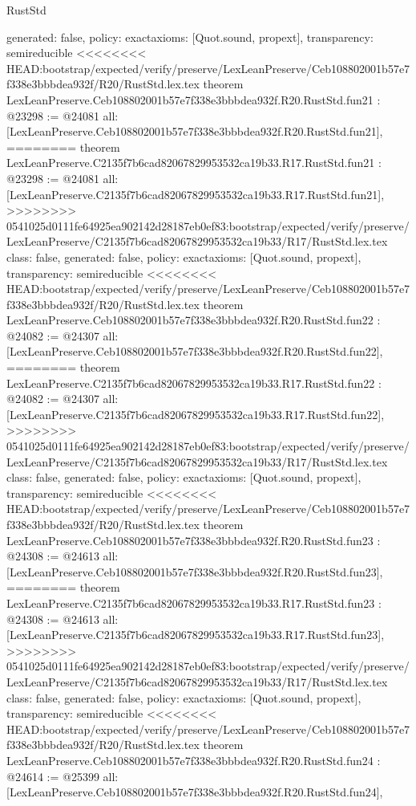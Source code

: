 \begin{lexlean}{RustStd}
\begin{coremodule}
{\begin{coremodule}
{{{{{{{{{{{{{{{{{{{{{{{{  generated: false,
  policy: exact{axioms: [Quot.sound, propext]},
  transparency: semireducible
}
<<<<<<<< HEAD:bootstrap/expected/verify/preserve/LexLeanPreserve/Ceb108802001b57e7f338e3bbbdea932f/R20/RustStd.lex.tex
theorem LexLeanPreserve.Ceb108802001b57e7f338e3bbbdea932f.R20.RustStd.fun21 : @23298 := @24081 {
  all: [LexLeanPreserve.Ceb108802001b57e7f338e3bbbdea932f.R20.RustStd.fun21],
========
theorem LexLeanPreserve.C2135f7b6cad82067829953532ca19b33.R17.RustStd.fun21 : @23298 := @24081 {
  all: [LexLeanPreserve.C2135f7b6cad82067829953532ca19b33.R17.RustStd.fun21],
>>>>>>>> 0541025d0111fe64925ea902142d28187eb0ef83:bootstrap/expected/verify/preserve/LexLeanPreserve/C2135f7b6cad82067829953532ca19b33/R17/RustStd.lex.tex
  class: false,
  generated: false,
  policy: exact{axioms: [Quot.sound, propext]},
  transparency: semireducible
}
<<<<<<<< HEAD:bootstrap/expected/verify/preserve/LexLeanPreserve/Ceb108802001b57e7f338e3bbbdea932f/R20/RustStd.lex.tex
theorem LexLeanPreserve.Ceb108802001b57e7f338e3bbbdea932f.R20.RustStd.fun22 : @24082 := @24307 {
  all: [LexLeanPreserve.Ceb108802001b57e7f338e3bbbdea932f.R20.RustStd.fun22],
========
theorem LexLeanPreserve.C2135f7b6cad82067829953532ca19b33.R17.RustStd.fun22 : @24082 := @24307 {
  all: [LexLeanPreserve.C2135f7b6cad82067829953532ca19b33.R17.RustStd.fun22],
>>>>>>>> 0541025d0111fe64925ea902142d28187eb0ef83:bootstrap/expected/verify/preserve/LexLeanPreserve/C2135f7b6cad82067829953532ca19b33/R17/RustStd.lex.tex
  class: false,
  generated: false,
  policy: exact{axioms: [Quot.sound, propext]},
  transparency: semireducible
}
<<<<<<<< HEAD:bootstrap/expected/verify/preserve/LexLeanPreserve/Ceb108802001b57e7f338e3bbbdea932f/R20/RustStd.lex.tex
theorem LexLeanPreserve.Ceb108802001b57e7f338e3bbbdea932f.R20.RustStd.fun23 : @24308 := @24613 {
  all: [LexLeanPreserve.Ceb108802001b57e7f338e3bbbdea932f.R20.RustStd.fun23],
========
theorem LexLeanPreserve.C2135f7b6cad82067829953532ca19b33.R17.RustStd.fun23 : @24308 := @24613 {
  all: [LexLeanPreserve.C2135f7b6cad82067829953532ca19b33.R17.RustStd.fun23],
>>>>>>>> 0541025d0111fe64925ea902142d28187eb0ef83:bootstrap/expected/verify/preserve/LexLeanPreserve/C2135f7b6cad82067829953532ca19b33/R17/RustStd.lex.tex
  class: false,
  generated: false,
  policy: exact{axioms: [Quot.sound, propext]},
  transparency: semireducible
}
<<<<<<<< HEAD:bootstrap/expected/verify/preserve/LexLeanPreserve/Ceb108802001b57e7f338e3bbbdea932f/R20/RustStd.lex.tex
theorem LexLeanPreserve.Ceb108802001b57e7f338e3bbbdea932f.R20.RustStd.fun24 : @24614 := @25399 {
  all: [LexLeanPreserve.Ceb108802001b57e7f338e3bbbdea932f.R20.RustStd.fun24],
}}}}}}}}}}}}}}}}}}}}}}}}}}}
\end{coremodule}}
\end{coremodule}
\end{lexlean}
